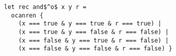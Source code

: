 \begin{lstlisting}
let rec and$^o$ x y r =
  ocanren {
    (x === true & y === true & r === true) |
    (x === true & y === false & r === false) |
    (x === false & y === true & r === false) |
    (x === false & y === false & r === false) }
\end{lstlisting}